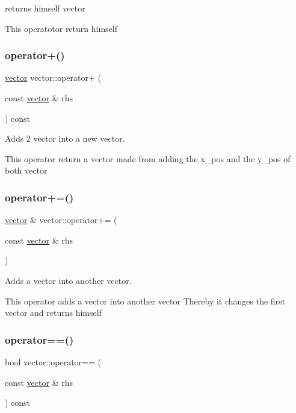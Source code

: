 returns himself vector 

This operatotor return himself \mbox{\label{classvector_a9d639bc53d77f17c6ba3af1dd9549424}} 
\subsubsection{\texorpdfstring{operator+()}{operator+()}\hspace{0.1cm}{\footnotesize\ttfamily [2/2]}}
{\footnotesize\ttfamily \hyperlink{classvector}{vector} vector\+::operator+ (\begin{DoxyParamCaption}\item[{const \hyperlink{classvector}{vector} \&}]{rhs }\end{DoxyParamCaption}) const}



Adds 2 vector into a new vector. 

This operator return a vector made from adding the x\+\_\+pos and the y\+\_\+pos of both vector \mbox{\label{classvector_a401c12597814627f350a8cd663b6dba5}} 
\subsubsection{\texorpdfstring{operator+=()}{operator+=()}}
{\footnotesize\ttfamily \hyperlink{classvector}{vector} \& vector\+::operator+= (\begin{DoxyParamCaption}\item[{const \hyperlink{classvector}{vector} \&}]{rhs }\end{DoxyParamCaption})}



Adds a vector into another vector. 

This operator adds a vector into another vector Thereby it changes the first vector and returns himself \mbox{\label{classvector_a0066b879f704f7d344ec9cd2a2f57ea3}} 
\subsubsection{\texorpdfstring{operator==()}{operator==()}}
{\footnotesize\ttfamily bool vector\+::operator== (\begin{DoxyParamCaption}\item[{const \hyperlink{classvector}{vector} \&}]{rhs }\end{DoxyParamCaption}) const}



